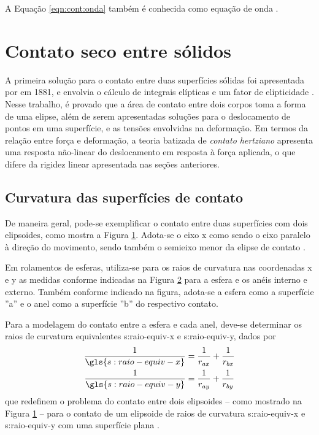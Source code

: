 \documentclass[12pt,oneside,english,brazil,lmodern,siglas,simbolos,cite=num]{ucsmonograph}
\begin{document}
	A Equação \ref{eqn:cont:onda} também é conhecida como equação de onda \cite{rao:2008}. 
	
	\section{Contato seco entre sólidos} \label{sec:contato-seco}
	A primeira solução para o contato entre duas superfícies sólidas foi apresentada por  em 1881, e envolvia o cálculo de integrais elípticas e um fator de elipticidade \cite{hertz:1881}.
	Nesse trabalho, é provado que a área de contato entre dois corpos toma a forma de uma elipse, além de serem apresentadas soluções para o deslocamento de pontos em uma superfície, e as tensões envolvidas na deformação.
	Em termos da relação entre força e deformação, a teoria batizada de \emph{contato hertziano} apresenta uma resposta não-linear do deslocamento em resposta à força aplicada, o que difere da rigidez linear apresentada nas seções anteriores.
	
	\subsection{Curvatura das superfícies de contato} \label{sec:curvatura-contato}
	De maneira geral, pode-se exemplificar o contato entre duas superfícies com dois elipsoides, como mostra a Figura \ref{fig:contato-elipses}.
	Adota-se o eixo x como sendo o eixo paralelo à direção do movimento, sendo também o semieixo menor da elipse de contato \cite{hamrock:1991}.
	\begin{figure}[ht]
		\label{fig:contato-elipses}
	\end{figure}

	Em rolamentos de esferas, utiliza-se para os raios de curvatura nas coordenadas x e y as medidas conforme indicadas na Figura \ref{fig:raios-rolamento} para a esfera e os anéis interno e externo.
	Também conforme indicado na figura, adota-se a esfera como a superfície ''a'' e o anel como a superfície ''b'' do respectivo contato.
	\begin{figure}[b]
		\label{fig:raios-rolamento}
	\end{figure}

	Para a modelagem do contato entre a esfera e cada anel, deve-se determinar os raios de curvatura equivalentes \gls{s:raio-equiv-x} e \gls{s:raio-equiv-y}, dados por
	\begin{gather}
		\frac{1}{\gls{s:raio-equiv-x}} = \frac{1}{r_{ax}} +
		\frac{1}{r_{bx}} \label{eqn:seco:r-equiv-x} \\
		\frac{1}{\gls{s:raio-equiv-y}} = \frac{1}{r_{ay}} +
		\frac{1}{r_{by}} \label{eqn:seco:r-equiv-y}
	\end{gather}
	que redefinem o problema do contato entre dois elipsoides -- como mostrado na Figura \ref{fig:contato-elipses} -- para o contato de um elipsoide de raios de curvatura \gls{s:raio-equiv-x} e \gls{s:raio-equiv-y} com uma superfície plana \cite{hamrock:1991}.
	
\end{document}

